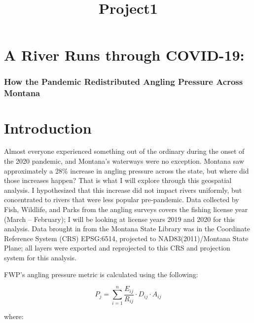 \documentclass[11pt]{article}
\title{Project1}
\begin{document}
    
    \maketitle
    
    

    
    \hypertarget{a-river-runs-through-covid-19}{%
\section{A River Runs through
COVID-19:}\label{a-river-runs-through-covid-19}}

\hypertarget{how-the-pandemic-redistributed-angling-pressure-across-montana}{%
\subsubsection{How the Pandemic Redistributed Angling Pressure Across
Montana}\label{how-the-pandemic-redistributed-angling-pressure-across-montana}}

    \hypertarget{introduction}{%
\section{Introduction}\label{introduction}}

Almost everyone experienced something out of the ordinary during the
onset of the 2020 pandemic, and Montana's waterways were no exception.
Montana saw approximately a 28\% increase in angling pressure across the
state, but where did those increases happen? That is what I will explore
through this geospatial analysis. I hypothesized that this increase did
not impact rivers uniformly, but concentrated to rivers that were less
popular pre-pandemic. Data collected by Fish, Wildlife, and Parks from
the angling surveys covers the fishing license year (March -- February);
I will be looking at license years 2019 and 2020 for this analysis. Data
brought in from the Montana State Library was in the Coordinate
Reference System (CRS) EPSG:6514, projected to NAD83(2011)/Montana State
Plane; all layers were exported and reprojected to this CRS and
projection system for this analysis.

FWP's angling pressure metric is calculated using the following:

\[
P_j = \sum_{i=1}^{n} \frac{E_{ij}}{R_{ij}} \cdot D_{ij} \cdot A_{ij}
\]

where:
\end{document}
